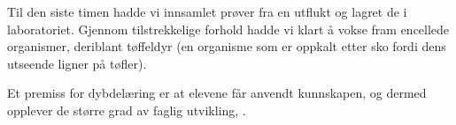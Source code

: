\documentclass[main.tex]{subfiles}
\begin{document}
Til den siste timen hadde vi innsamlet prøver fra en utflukt og lagret de i laboratoriet. 
Gjennom tilstrekkelige forhold hadde vi klart å vokse fram encellede organismer, deriblant tøffeldyr 
(en organisme som er oppkalt etter sko fordi dens utseende ligner på tøfler).

Et premiss for dybdelæring er at elevene får anvendt kunnskapen, og dermed opplever de større grad av faglig utvikling, .
\end{document}
